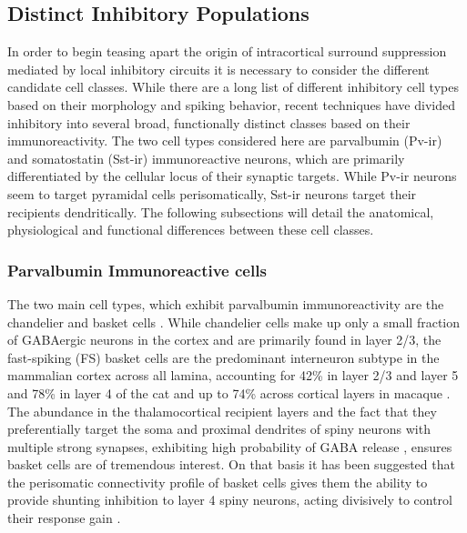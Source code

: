 \subsection{Distinct Inhibitory Populations} \label{InhibitoryBackground}

In order to begin teasing apart the origin of intracortical surround
suppression mediated by local inhibitory circuits it is necessary to
consider the different candidate cell classes. While there are a long
list of different inhibitory cell types based on their morphology and
spiking behavior, recent techniques have divided inhibitory into
several broad, functionally distinct classes based on their
immunoreactivity. The two cell types considered here are parvalbumin
(Pv-ir) and somatostatin (Sst-ir) immunoreactive neurons, which are
primarily differentiated by the cellular locus of their synaptic
targets. While Pv-ir neurons seem to target pyramidal cells
perisomatically, Sst-ir neurons target their recipients
dendritically. The following subsections will detail the anatomical,
physiological and functional differences between these cell classes.

\subsubsection{Parvalbumin Immunoreactive cells}

The two main cell types, which exhibit parvalbumin immunoreactivity
are the chandelier and basket cells \citep{Binzegger2004}. While
chandelier cells make up only a small fraction of GABAergic neurons in
the cortex and are primarily found in layer 2/3, the fast-spiking (FS)
basket cells are the predominant interneuron subtype in the mammalian
cortex across all lamina, accounting for 42\% in layer 2/3 and layer 5
and 78\% in layer 4 of the cat \citep{Hogan1992,Huxlin2001} and up to
74\% across cortical layers in macaque \citep{VanBrederode1990}. The
abundance in the thalamocortical recipient layers and the fact that
they preferentially target the soma and proximal dendrites of spiny
neurons with multiple strong synapses, exhibiting high probability of
GABA release \citep{Freund2007,Markram2004}, ensures basket cells are
of tremendous interest. On that basis it has been suggested that the
perisomatic connectivity profile of basket cells gives them the
ability to provide shunting inhibition to layer 4 spiny neurons,
acting divisively to control their response gain \citep{Wilson2012}.

